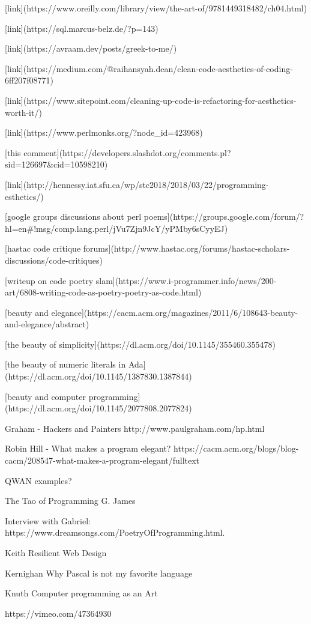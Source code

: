 [link](https://www.oreilly.com/library/view/the-art-of/9781449318482/ch04.html)

[link](https://sql.marcus-belz.de/?p=143)

[link](https://avraam.dev/posts/greek-to-me/)

[link](https://medium.com/@raihansyah.dean/clean-code-aesthetics-of-coding-6ff207f08771)

[link](https://www.sitepoint.com/cleaning-up-code-is-refactoring-for-aesthetics-worth-it/)

[link](https://www.perlmonks.org/?node_id=423968)

[this comment](https://developers.slashdot.org/comments.pl?sid=126697&cid=10598210)

[link](http://hennessy.iat.sfu.ca/wp/stc2018/2018/03/22/programming-esthetics/)

[google groups discussions about perl poems](https://groups.google.com/forum/?hl=en#!msg/comp.lang.perl/jVu7Zjn9JcY/yPMby6sCyyEJ)

[hastac code critique forums](http://www.hastac.org/forums/hastac-scholars-discussions/code-critiques)

[writeup on code poetry slam](https://www.i-programmer.info/news/200-art/6808-writing-code-as-poetry-poetry-as-code.html)

[beauty and elegance](https://cacm.acm.org/magazines/2011/6/108643-beauty-and-elegance/abstract)

[the beauty of simplicity](https://dl.acm.org/doi/10.1145/355460.355478)

[the beauty of numeric literals in Ada](https://dl.acm.org/doi/10.1145/1387830.1387844)

[beauty and computer programming](https://dl.acm.org/doi/10.1145/2077808.2077824)

Graham - Hackers and Painters http://www.paulgraham.com/hp.html

Robin Hill - What makes a program elegant? https://cacm.acm.org/blogs/blog-cacm/208547-what-makes-a-program-elegant/fulltext

QWAN examples?

The Tao of Programming G. James

Interview with Gabriel: https://www.dreamsongs.com/PoetryOfProgramming.html.

Keith Resilient Web Design

Kernighan Why Pascal is not my favorite language

Knuth Computer programming as an Art

https://vimeo.com/47364930
